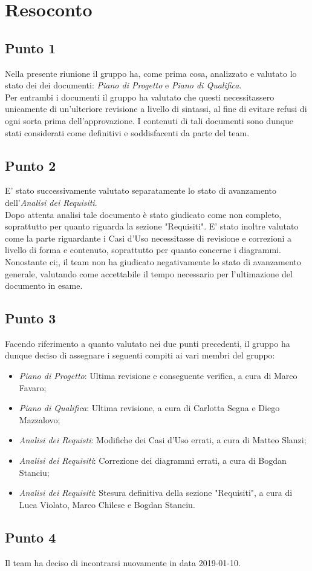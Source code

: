 \section{Resoconto}

\subsection{Punto 1}
Nella presente riunione il gruppo ha, come prima cosa, analizzato e valutato lo stato dei dei documenti: \textit{Piano di Progetto} e \textit{Piano di Qualifica}.\\
Per entrambi i documenti il gruppo ha valutato che questi necessitassero unicamente di un'ulteriore revisione a livello di sintassi, al fine di evitare refusi di ogni sorta prima dell'approvazione. I contenuti di tali documenti sono dunque stati considerati come definitivi e soddisfacenti da parte del team.\\

\subsection{Punto 2}
E' stato successivamente valutato separatamente lo stato di avanzamento dell'\textit{Analisi dei Requisiti}.\\
Dopo attenta analisi tale documento è stato giudicato come non completo, soprattutto per quanto riguarda la sezione "Requisiti". E' stato inoltre valutato come la parte riguardante i Casi d'Uso necessitasse di revisione e correzioni a livello di forma e contenuto, soprattutto per quanto concerne i diagrammi.\\ 
Nonostante ci;, il team non ha giudicato negativamente lo stato di avanzamento generale, valutando come accettabile il tempo necessario per l'ultimazione del documento in esame.

\subsection{Punto 3}
Facendo riferimento a quanto valutato nei due punti precedenti, il gruppo ha dunque deciso di assegnare i seguenti compiti ai vari membri del gruppo:
\begin{itemize}
	\item \textit{Piano di Progetto}: Ultima revisione e conseguente verifica, a cura di Marco Favaro;
	\item \textit{Piano di Qualifica}: Ultima revisione, a cura di Carlotta Segna e Diego Mazzalovo;
	\item \textit{Analisi dei Requisti}: Modifiche dei Casi d'Uso errati, a cura di Matteo Slanzi;
	\item \textit{Analisi dei Requisiti}: Correzione dei diagrammi errati, a cura di Bogdan Stanciu;
	\item \textit{Analisi dei Requisiti}: Stesura definitiva della sezione "Requisiti", a cura di Luca Violato, Marco Chilese e Bogdan Stanciu.
\end{itemize}

\subsection{Punto 4}
Il team ha deciso di incontrarsi nuovamente in data 2019-01-10.

